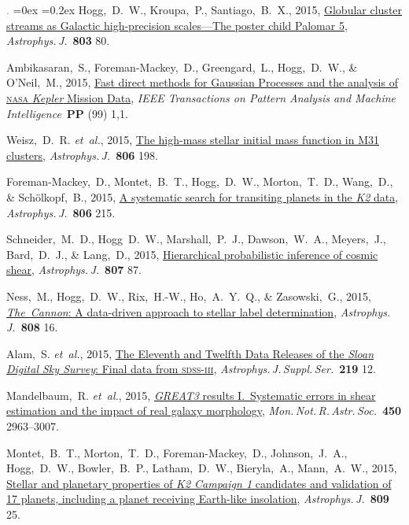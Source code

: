 \documentclass[12pt,letterpaper]{article}
\newcommand{\latin}[1]{\textsl{#1}}
\newcommand{\etal}{\latin{et~al.}}
\newcommand{\satellite}[1]{\textsl{#1}}
\newcommand{\project}[1]{\textsl{#1}}
\newcommand{\doi}[2]{\href{http://dx.doi.org/#1}{{#2}}}
\newcommand{\deemph}[1]{\textcolor{grey}{\footnotesize{#1}}}
\newcommand{\pubnumber}[1]{\deemph{{#1}.}}
\newcounter{refpubnum}
\newcommand{\hogglist}{%
    \rightmargin=0in
    \leftmargin=0.18in
    \topsep=0ex
    \partopsep=0pt
    \itemsep=0.2ex
    \parsep=0pt
    \itemindent=-1.0\leftmargin
    \listparindent=0.0\leftmargin
    \settowidth{\labelsep}{~}
    \usecounter{refpubnum}
  }
\begin{document}
\begin{list}{\pubnumber{\therefpubnum}}{\hogglist}
Hogg,~D.~W., Kroupa,~P., Santiago,~B.~X., 2015,
\doi{10.1088/0004-637X/803/2/80}{Globular cluster streams as
Galactic high-precision scales---The poster child Palomar 5},
\textit{Astrophys.\,J.}\ \textbf{803} 80.
\item
Ambikasaran,~S., Foreman-Mackey,~D., Greengard,~L., Hogg,~D.~W., \& O'Neil,~M., 2015,
\doi{10.1109/TPAMI.2015.2448083}{Fast direct methods for Gaussian Processes and the analysis of \textsc{nasa} \satellite{Kepler} Mission Data},
\textit{IEEE Transactions on Pattern Analysis and Machine Intelligence}\ \textbf{PP} (99) 1,1.
\item
Weisz,~D.~R. \etal, 2015,
\doi{10.1088/0004-637X/806/2/198}{The high-mass stellar initial mass function in M31 clusters},
\textit{Astrophys.\,J.}\ \textbf{806} 198.
\item
Foreman-Mackey,~D., Montet,~B.~T., Hogg,~D.~W., Morton,~T.~D.,
Wang,~D., \& Sch\"olkopf,~B., 2015,
\doi{10.1088/0004-637X/806/2/215}{A systematic search for transiting planets in the \project{K2} data},
\textit{Astrophys.\,J.}\ \textbf{806} 215.
\item
Schneider,~M.~D., Hogg~D.~W., Marshall,~P.~J., Dawson,~W.~A., Meyers,~J.,
Bard,~D.~J., \& Lang,~D., 2015,
\doi{10.1088/0004-637X/807/1/87}{Hierarchical probabilistic inference of cosmic shear},
\textit{Astrophys.\,J.}\ \textbf{807} 87.
\item
Ness,~M., Hogg,~D.~W., Rix,~H.-W., Ho,~A.~Y.~Q., \& Zasowski,~G., 2015,
\doi{10.1088/0004-637X/808/1/16}{\project{The~Cannon}: A data-driven
approach to stellar label determination},
\textit{Astrophys.\,J.}\ \textbf{808} 16.
\item
Alam,~S. \etal, 2015,
\doi{10.1088/0067-0049/219/1/12}{The Eleventh and Twelfth Data Releases of the \project{Sloan Digital Sky Survey}: Final data from \textsc{sdss-iii}},
\textit{Astrophys.\,J.\,Suppl.\,Ser.}\ \textbf{219} 12.
\item
Mandelbaum,~R. \etal, 2015,
\doi{10.1093/mnras/stv781}{\project{GREAT3} results I.\ Systematic errors in shear
estimation and the impact of real galaxy morphology},
\textit{Mon.\,Not.\,R.\,Astr.\,Soc.}\ \textbf{450} 2963--3007.
\item
Montet,~B.~T., Morton,~T.~D., Foreman-Mackey,~D., Johnson,~J.~A., Hogg,~D.~W.,
Bowler,~B.~P., Latham,~D.~W., Bieryla,~A., Mann,~A.~W., 2015,
\doi{10.1088/0004-637X/809/1/25}{Stellar and planetary properties of
\project{K2 Campaign 1} candidates and validation of 17 planets,
including a planet receiving Earth-like insolation},
\textit{Astrophys.\,J.}\ \textbf{809} 25.

\end{list}
\end{document}
